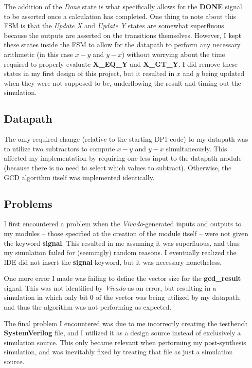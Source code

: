 \documentclass[a4paper, 12pt]{article}
\newcommand*{\Vivado}{\textit{Vivado}\xspace} %
\newcommand*{\SV}{\textbf{SystemVerilog}\xspace} %
\begin{document}
The addition of the \textit{Done} state is what specifically allows for the \textbf{DONE} signal to be asserted once a calculation has completed. One thing to note about this FSM is that the \textit{Update X} and \textit{Update Y} states are somewhat superfluous because the outputs are asserted on the transitions themselves. However, I kept these states inside the FSM to allow for the datapath to perform any necessary arithmetic (in this case $x-y$ and $y-x$) without worrying about the time required to properly evaluate \textbf{X\_EQ\_Y} and \textbf{X\_GT\_Y}. I did remove these states in my first design of this project, but it resulted in $x$ and $y$ being updated when they were not supposed to be, underflowing the result and timing out the simulation.

\subsection{Datapath}
The only required change (relative to the starting DP1 code) to my datapath was to utilize two subtractors to compute $x-y$ and $y-x$ simultaneously. This affected my implementation by requiring one less input to the datapath module (because there is no need to select which values to subtract). Otherwise, the GCD algorithm itself was implemented identically.

\subsection{Problems}
I first encountered a problem when the \Vivado -generated inputs and outputs to my modules -- those specified at the creation of the module itself -- were not given the keyword \textbf{signal}. This resulted in me assuming it was superfluous, and thus my simulation failed for (seemingly) random reasons. I eventually realized the IDE did not insert the \textbf{signal} keyword, but it was necessary nonetheless.

One more error I made was failing to define the vector size for the \textbf{gcd\_result} signal. This was not identified by \Vivado as an error, but resulting in a simulation in which only bit 0 of the vector was being utilized by my datapath, and thus the algorithm was not performing as expected.

The final problem I encountered was due to me incorrectly creating the testbench \SV file, and I utilized it as a design source instead of exclusively a simulation source. This only became relevant when performing my post-synthesis simulation, and was inevitably fixed by treating that file as just a simulation source.
\end{document}
